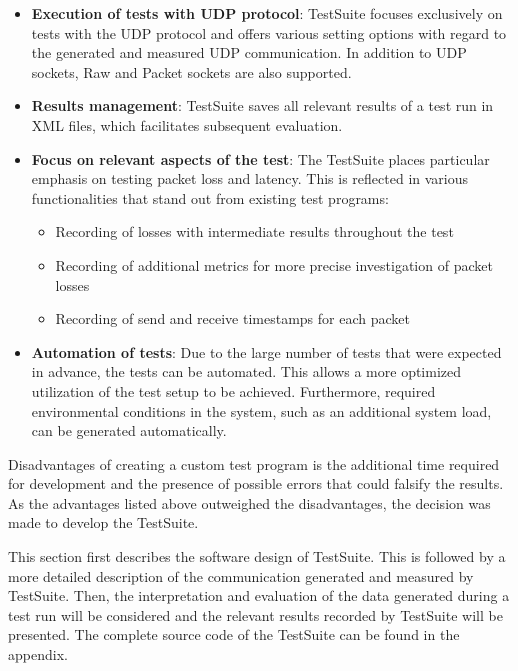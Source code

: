 \begin{itemize}
\item \textbf{Execution of tests with UDP protocol}: TestSuite focuses exclusively on tests with the UDP protocol and offers various setting options with regard to the generated and measured UDP communication. In addition to UDP sockets, Raw and Packet sockets are also supported.
\item \textbf{Results management}: TestSuite saves all relevant results of a test run in XML files, which facilitates subsequent evaluation.
\item \textbf{Focus on relevant aspects of the test}: The TestSuite places particular emphasis on testing packet loss and latency. This is reflected in various functionalities that stand out from existing test programs:

	\begin{itemize}
      \item Recording of losses with intermediate results throughout the test
      \item Recording of additional metrics for more precise investigation of packet losses
      \item Recording of send and receive timestamps for each packet
    \end{itemize}

\item \textbf{Automation of tests}: Due to the large number of tests that were expected in advance, the tests can be automated. This allows a more optimized utilization of the test setup to be achieved. Furthermore, required environmental conditions in the system, such as an additional system load, can be generated automatically.
\end{itemize}

Disadvantages of creating a custom test program is the additional time required for development and the presence of possible errors that could falsify the results. As the advantages listed above outweighed the disadvantages, the decision was made to develop the TestSuite.

This section first describes the software design of TestSuite. This is followed by a more detailed description of the communication generated and measured by TestSuite. Then, the interpretation and evaluation of the data generated during a test run will be considered and the relevant results recorded by TestSuite will be presented. The complete source code of the TestSuite can be found in the appendix.


